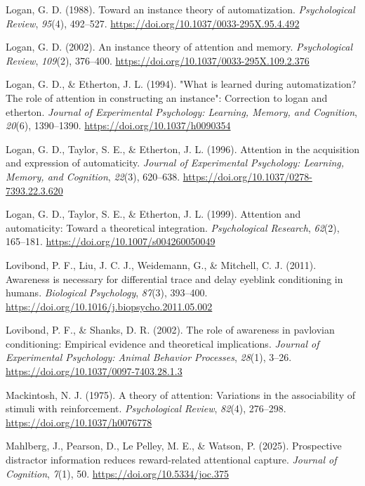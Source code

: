 \documentclass[
  man,
  floatsintext,
  longtable,
  nolmodern,
  notxfonts,
  notimes,
  mask,
  colorlinks=true,linkcolor=blue,citecolor=blue,urlcolor=blue]{apa7}
\newlength{\cslhangindent}
\newenvironment{CSLReferences}[2] %
 {\begin{list}{}{%
  \setlength{\itemindent}{0pt}
  \setlength{\leftmargin}{0pt}
  \setlength{\parsep}{0pt}
  \ifodd #1
   \setlength{\leftmargin}{\cslhangindent}
   \setlength{\itemindent}{-1\cslhangindent}
  \fi
  \setlength{\itemsep}{#2\baselineskip}}}
 {\end{list}}
\begin{document}
\begin{CSLReferences}{1}{0}
Logan, G. D. (1988). Toward an instance theory of automatization.
\emph{Psychological Review}, \emph{95}(4), 492--527.
\url{https://doi.org/10.1037/0033-295X.95.4.492}

Logan, G. D. (2002). An instance theory of attention and memory.
\emph{Psychological Review}, \emph{109}(2), 376--400.
\url{https://doi.org/10.1037/0033-295X.109.2.376}

Logan, G. D., \& Etherton, J. L. (1994). {"}What is learned during
automatization? The role of attention in constructing an instance{"}:
Correction to logan and etherton. \emph{Journal of Experimental
Psychology: Learning, Memory, and Cognition}, \emph{20}(6), 1390--1390.
\url{https://doi.org/10.1037/h0090354}

Logan, G. D., Taylor, S. E., \& Etherton, J. L. (1996). Attention in the
acquisition and expression of automaticity. \emph{Journal of
Experimental Psychology: Learning, Memory, and Cognition}, \emph{22}(3),
620--638. \url{https://doi.org/10.1037/0278-7393.22.3.620}

Logan, G. D., Taylor, S. E., \& Etherton, J. L. (1999). Attention and
automaticity: Toward a theoretical integration. \emph{Psychological
Research}, \emph{62}(2), 165--181.
\url{https://doi.org/10.1007/s004260050049}

Lovibond, P. F., Liu, J. C. J., Weidemann, G., \& Mitchell, C. J.
(2011). Awareness is necessary for differential trace and delay eyeblink
conditioning in humans. \emph{Biological Psychology}, \emph{87}(3),
393--400. \url{https://doi.org/10.1016/j.biopsycho.2011.05.002}

Lovibond, P. F., \& Shanks, D. R. (2002). The role of awareness in
pavlovian conditioning: Empirical evidence and theoretical implications.
\emph{Journal of Experimental Psychology: Animal Behavior Processes},
\emph{28}(1), 3--26. \url{https://doi.org/10.1037/0097-7403.28.1.3}

Mackintosh, N. J. (1975). A theory of attention: Variations in the
associability of stimuli with reinforcement. \emph{Psychological
Review}, \emph{82}(4), 276--298. \url{https://doi.org/10.1037/h0076778}

Mahlberg, J., Pearson, D., Le Pelley, M. E., \& Watson, P. (2025).
Prospective distractor information reduces reward-related attentional
capture. \emph{Journal of Cognition}, \emph{7}(1), 50.
\url{https://doi.org/10.5334/joc.375}


\end{CSLReferences}
\end{document}

